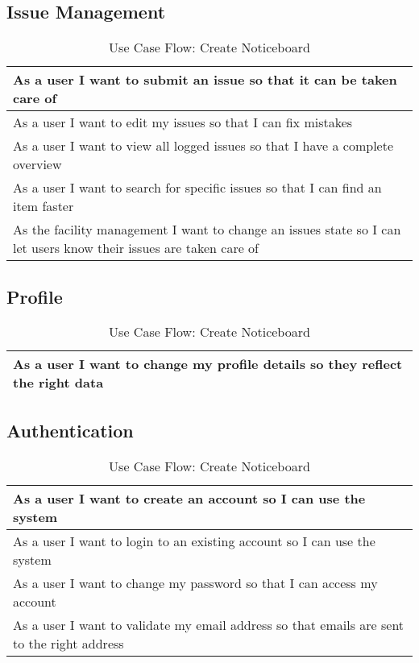 \subsection{Issue Management}
\begin{table}[H]
  \begin{tabularx}{\linewidth}{|X|}
    \hline
      As a user I want to submit an issue so that it can be taken care of \\
     \hline
      As a user I want to edit my issues so that I can fix mistakes \\
     \hline
      As a user I want to view all logged issues so that I have a complete overview \\
     \hline
      As a user I want to search for specific issues so that I can find an item faster \\
     \hline
      As the facility management I want to change an issues state so I can let users know their issues are taken care of \\
     \hline  
  \end{tabularx}
  \caption{Use Case Flow: Create Noticeboard}
\end{table}

\subsection{Profile}
\begin{table}[H]
  \begin{tabularx}{\linewidth}{|X|}
    \hline
      As a user I want to change my profile details so they reflect the right data \\
     \hline 
  \end{tabularx}
  \caption{Use Case Flow: Create Noticeboard}
\end{table}

\subsection{Authentication}
\begin{table}[H]
  \begin{tabularx}{\linewidth}{|X|}
    \hline
      As a user I want to create an account so I can use the system \\
     \hline
      As a user I want to login to an existing account so I can use the system \\
     \hline
      As a user I want to change my password so that I can access my account \\
     \hline
      As a user I want to validate my email address so that emails are sent to the right address \\
     \hline 
  \end{tabularx}
  \caption{Use Case Flow: Create Noticeboard}
\end{table}

